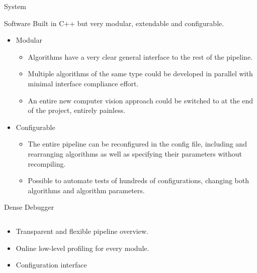\documentclass[final,hyperref={pdfpagelabels=false}]{beamer}
\begin{document}
\begin{frame}[t]
\begin{columns}[t]
\begin{column}{.465\textwidth}
\begin{block}{System}
\end{block}


\begin{block}{Software}
Built in C++ but very modular, extendable and configurable.
\begin{itemize}
\item Modular
\begin{itemize}
\item Algorithms have a very clear general interface to the rest of the pipeline.
\item Multiple algorithms of the same type could be developed in parallel with minimal interface compliance effort.
\item An entire new computer vision approach could be switched to at the end of the project, entirely painless.
\end{itemize}
\end{itemize}
\begin{itemize}
\item Configurable
\begin{itemize}
\item The entire pipeline can be reconfigured in the config file, including and rearranging algorithms as well as specifying their parameters without recompiling.
\item Possible to automate tests of hundreds of configurations, changing both algorithms and algorithm parameters.
\end{itemize}
\end{itemize}
\end{block}


\begin{block}{Dense Debugger}

\begin{columns} %
\begin{column}{.54\textwidth} %

\begin{itemize}
\item Transparent and flexible pipeline overview.
\item Online low-level profiling for every module.
\item Configuration interface


\end{itemize}
\end{column}
\end{columns}
\end{block}
\end{column}
\end{columns}
\end{frame}
\end{document}
